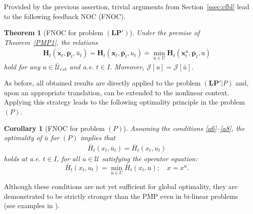 \documentclass[sn-mathphys-num]{sn-jnl}
\numberwithin{equation}{section}
\theoremstyle{mythm}
\newtheorem{theorem}[proposition]{Theorem}
\newtheorem{corollary}[proposition]{Corollary}
\theoremstyle{mydef}
\begin{document}
Provided by the previous assertion, trivial arguments from Section~\ref{ssec:cfbl} lead to the following %
feedback NOC (FNOC).
\begin{theorem}[FNOC for problem $(\bm{LP}')$]\label{thm}
    Under the premise of Theorem~\ref{PMP1}, the relations
\begin{align*}
    \bm H_t(\bm x_t,  \bar{\bm p}_t, \bar u_t) = \bm H_t(\bm x_t,  \bar{\bm p}_t, u_t)\doteq \min_{\mathrm u \in U}\bm H_t(\bm x_t^{u},  \bar{\bm p}_t, \mathrm u)
\end{align*}
    hold for any $u \in \bar{\mathcal U}_{ext}$ and a.e. $t \in I$. Moreover, $\mathcal J[u] = \mathcal J[\bar u]$.
\end{theorem}

As before, all obtained results are directly applied to the problem $(\bm{LP}'|P)$ and, upon an appropriate translation, can be extended to the nonlinear context. Applying this strategy leads to the following optimality principle in the problem $(P)$.
\begin{corollary}[FNOC for problem $(P)$]
Assuming the conditions \ref{a6}--\ref{a8}, the optimality of $\bar{u}$ for $(P)$ implies that
\begin{align*}
    \bar{H}_t(x_t, \bar{u}_t) = \bar{H}_t(x_t, u_t)
\end{align*}
holds at a.e. $t \in I$, for all $u \in \mathcal{U}$ satisfying the operator equation:
\begin{equation}
    \bar{H}_t(x_t, u_t) = \min_{\mathrm{u} \in U} \bar{H}_t(x_t, \mathrm{u}); \quad x = x^u. \label{u-comp}
\end{equation}
\end{corollary}

Although these conditions are not yet sufficient for global optimality, they are demonstrated to be strictly stronger than the PMP even in bi-linear problems (see examples in \cite{CSP-neur, pogodaevExactFormulaeIncrement2024}).
\end{document}
